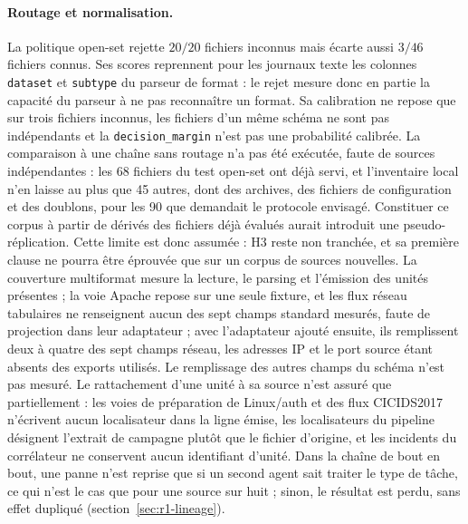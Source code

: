 \paragraph{Routage et normalisation.}
La politique open-set rejette $20/20$ fichiers inconnus mais écarte aussi $3/46$ fichiers
connus. Ses scores reprennent pour les journaux texte les colonnes \texttt{dataset} et
\texttt{subtype} du parseur de format : le rejet mesure donc en partie la capacité du
parseur à ne pas reconnaître un format. Sa calibration ne repose que sur trois fichiers
inconnus, les fichiers d'un même schéma ne sont pas indépendants et la
\texttt{decision\_margin} n'est pas une probabilité calibrée. La comparaison à une chaîne
sans routage n'a pas été exécutée, faute de sources indépendantes : les 68 fichiers du test
open-set ont déjà servi, et l'inventaire local n'en laisse au plus que 45 autres, dont des
archives, des fichiers de configuration et des doublons, pour les 90 que demandait le
protocole envisagé. Constituer ce corpus à partir de dérivés des fichiers déjà évalués
aurait introduit une pseudo-réplication. Cette limite est donc assumée : H3 reste non
tranchée, et sa première clause ne pourra être éprouvée que sur un corpus de sources
nouvelles. La couverture multiformat mesure
la lecture, le parsing et l'émission des unités présentes ; la voie Apache repose sur une
seule fixture, et les flux réseau tabulaires ne renseignent aucun des sept champs standard
mesurés, faute de projection dans leur adaptateur ; avec l'adaptateur ajouté ensuite, ils
remplissent deux à quatre des sept champs réseau, les adresses IP et le port source étant
absents des exports utilisés. Le remplissage des autres champs du schéma n'est pas mesuré.
Le rattachement d'une unité à sa source n'est assuré que partiellement : les voies de
préparation de Linux/auth et des flux CICIDS2017 n'écrivent aucun localisateur dans la ligne
émise, les localisateurs du pipeline désignent l'extrait de campagne plutôt que le fichier
d'origine, et les incidents du corrélateur ne conservent aucun identifiant d'unité. Dans la
chaîne de bout en bout, une panne n'est reprise que si un second agent sait traiter le type
de tâche, ce qui n'est le cas que pour une source sur huit ; sinon, le résultat est perdu,
sans effet dupliqué (section~\ref{sec:r1-lineage}).

